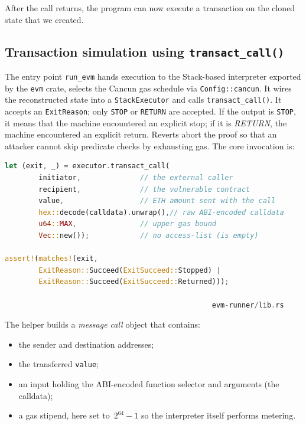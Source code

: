 After the call returns, the program can now execute a transaction on the cloned state that we created. 

\subsection{Transaction simulation using \texttt{transact\_call()}}

The entry point \texttt{run\_evm} hands execution to the Stack-based interpreter
exported by the \texttt{evm} crate, selects the Cancun gas schedule via
\texttt{Config::cancun}.  It wires the reconstructed state into a
\texttt{StackExecutor} \cite{stackexecutor} and calls \texttt{transact\allowbreak\_call()}. It accepts an \texttt{ExitReason}; only \texttt{STOP} or \texttt{RETURN} are accepted. If the output is \texttt{STOP}, it means that the machine encountered an explicit stop; if it is \textit{RETURN}, the machine encountered an explicit return. Reverts abort the proof so that an attacker cannot skip predicate checks by exhausting gas. The core invocation is:

\begin{lstlisting}[caption={[Dispatching the call]},language=Rust]
let (exit, _) = executor.transact_call(
        initiator,              // the external caller
        recipient,              // the vulnerable contract
        value,                  // ETH amount sent with the call
        hex::decode(calldata).unwrap(),// raw ABI-encoded calldata
        u64::MAX,               // upper gas bound
        Vec::new());            // no access-list (is empty)
        
assert!(matches!(exit,
        ExitReason::Succeed(ExitSucceed::Stopped) |
        ExitReason::Succeed(ExitSucceed::Returned)));

                                                 evm-runner/lib.rs
\end{lstlisting}

The helper builds a \textit{message call} object that contains:

\begin{itemize}
  \item the sender and destination addresses;
  \item the transferred \texttt{value};
  \item an input holding the ABI-encoded function selector and arguments (the calldata);
  \item a gas stipend, here set to \(\,2^{64}-1\) so the interpreter itself
        performs metering.
\end{itemize}

